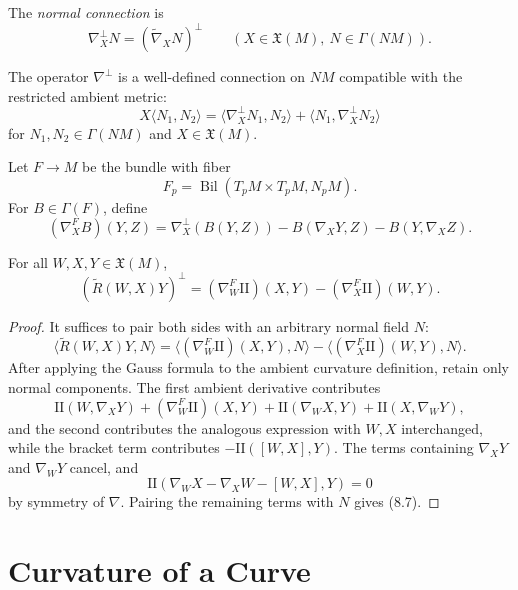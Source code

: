 The \emph{normal connection} is
\[
\nabla_X^\perp N=(\widetilde\nabla_XN)^\perp
\qquad
(X\in\mathfrak X(M),\ N\in\Gamma(NM)).
\]

\begin{proposition}
\label{prop:normal-connection-well-defined}

The operator $\nabla^\perp$ is a well-defined connection on $NM$ compatible
with the restricted ambient metric:
\[
X\langle N_1,N_2\rangle
=\langle\nabla_X^\perp N_1,N_2\rangle
 +\langle N_1,\nabla_X^\perp N_2\rangle
\]
for $N_1,N_2\in\Gamma(NM)$ and $X\in\mathfrak X(M)$.
\end{proposition}

Let $F\to M$ be the bundle with fiber
\[
F_p=\operatorname{Bil}(T_pM\times T_pM,N_pM).
\]
For $B\in\Gamma(F)$, define
\[
(\nabla_X^FB)(Y,Z)
=\nabla_X^\perp(B(Y,Z))
-B(\nabla_XY,Z)-B(Y,\nabla_XZ).
\]

\begin{theorem}
\label{thm:codazzi-equation}

For all $W,X,Y\in\mathfrak X(M)$,
\begin{equation}
(\widetilde R(W,X)Y)^\perp
=(\nabla_W^F\mathrm{II})(X,Y)-(\nabla_X^F\mathrm{II})(W,Y).
\tag{8.6}
\end{equation}
\end{theorem}

\begin{proof}
\sketch It suffices to pair both sides with an arbitrary normal field $N$:
\begin{equation}
\langle\widetilde R(W,X)Y,N\rangle
=\langle(\nabla_W^F\mathrm{II})(X,Y),N\rangle
-\langle(\nabla_X^F\mathrm{II})(W,Y),N\rangle.
\tag{8.7}
\end{equation}
After applying the Gauss formula to the ambient curvature definition, retain
only normal components. The first ambient derivative contributes
\[
\mathrm{II}(W,\nabla_XY)
+(\nabla_W^F\mathrm{II})(X,Y)
+\mathrm{II}(\nabla_WX,Y)
+\mathrm{II}(X,\nabla_WY),
\]
and the second contributes the analogous expression with $W,X$ interchanged,
while the bracket term contributes $-\mathrm{II}([W,X],Y)$. The terms
containing $\nabla_XY$ and $\nabla_WY$ cancel, and
\[
\mathrm{II}(\nabla_WX-\nabla_XW-[W,X],Y)=0
\]
by symmetry of $\nabla$. Pairing the remaining terms with $N$ gives (8.7).
\end{proof}

\section{Curvature of a Curve}

